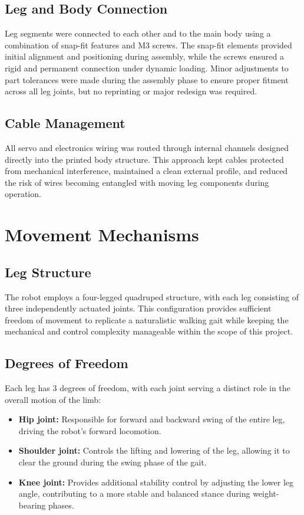\documentclass{article}
\begin{document}
\subsection*{Leg and Body Connection}

Leg segments were connected to each other and to the main body using a combination of snap-fit features and M3 screws. The snap-fit elements provided initial alignment and positioning during assembly, while the screws ensured a rigid and permanent connection under dynamic loading. Minor adjustments to part tolerances were made during the assembly phase to ensure proper fitment across all leg joints, but no reprinting or major redesign was required.

\subsection*{Cable Management}

All servo and electronics wiring was routed through internal channels designed directly into the printed body structure. This approach kept cables protected from mechanical interference, maintained a clean external profile, and reduced the risk of wires becoming entangled with moving leg components during operation.

\section{Movement Mechanisms}

\subsection*{Leg Structure}

The robot employs a four-legged quadruped structure, with each leg consisting of three independently actuated joints. This configuration provides sufficient freedom of movement to replicate a naturalistic walking gait while keeping the mechanical and control complexity manageable within the scope of this project.

\subsection*{Degrees of Freedom}

Each leg has 3 degrees of freedom, with each joint serving a distinct role in the overall motion of the limb:

\begin{itemize}
    \item \textbf{Hip joint:} Responsible for forward and backward swing of the entire leg, driving the robot's forward locomotion.
    \item \textbf{Shoulder joint:} Controls the lifting and lowering of the leg, allowing it to clear the ground during the swing phase of the gait.
    \item \textbf{Knee joint:} Provides additional stability control by adjusting the lower leg angle, contributing to a more stable and balanced stance during weight-bearing phases.
\end{itemize}
\end{document}
